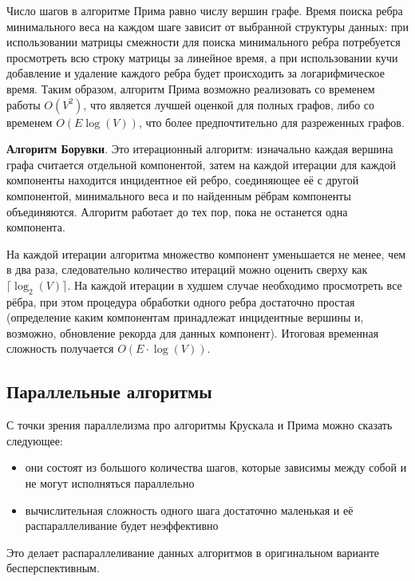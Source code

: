 \documentclass[a4paper,10pt]{extarticle}
\begin{document}
Число шагов в алгоритме Прима равно числу вершин графе. Время поиска ребра минимального веса на каждом шаге зависит от выбранной структуры данных: при использовании матрицы смежности для поиска минимального ребра потребуется просмотреть всю строку матрицы за линейное время, а при использовании кучи добавление и удаление каждого ребра будет происходить за логарифмическое время. 
Таким образом, алгоритм Прима возможно реализовать со временем работы $O(V^2)$, что является лучшей оценкой для полных графов, либо со временем $O(E \log (V))$, что более предпочтительно для разреженных графов.


\textbf{Алгоритм Борувки}.
Это итерационный алгоритм: изначально каждая вершина графа считается отдельной компонентой, затем на каждой итерации для каждой компоненты находится инцидентное ей ребро, соединяющее её с другой компонентой, минимального веса и по найденным рёбрам компоненты объединяются. Алгоритм работает до тех пор, пока не останется одна компонента.

На каждой итерации алгоритма множество компонент уменьшается не менее, чем в два раза, следовательно количество итераций можно оценить сверху как $\lceil \log_2(V) \rceil$. На каждой итерации в худшем случае необходимо просмотреть все рёбра, при этом процедура обработки одного ребра достаточно простая (определение каким компонентам принадлежат инцидентные вершины и, возможно, обновление рекорда для данных компонент). Итоговая временная сложность получается $O(E \cdot \log(V))$.

\subsection{Параллельные алгоритмы}

С точки зрения параллелизма про алгоритмы Крускала и Прима можно сказать следующее:
\begin{itemize}
	\item они состоят из большого количества шагов, которые зависимы между собой и не могут исполняться параллельно
	\item вычислительная сложность одного шага достаточно маленькая и её распараллеливание будет неэффективно
\end{itemize}
Это делает распараллеливание данных алгоритмов в оригинальном варианте бесперспективным. 
\end{document}
